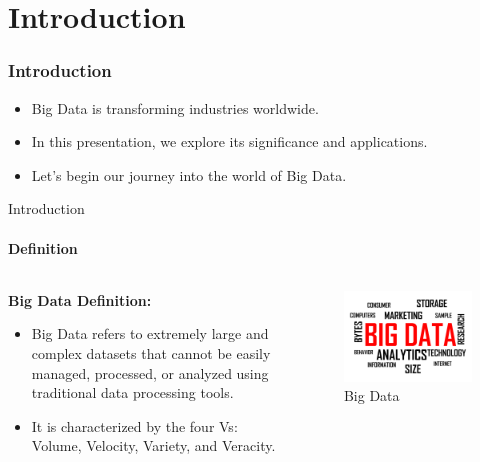 \documentclass{beamer}
\begin{document}
\section{Introduction}
	\begin{frame}
	\frametitle{Introduction}
		\begin{itemize}
  			\item Big Data is transforming industries worldwide.
  			\item In this presentation, we explore its significance and applications.
  			\item Let's begin our journey into the world of Big Data.
		\end{itemize}
	\end{frame}
	\begin{frame}[label=definition]{Introduction}
	\framesubtitle{Definition}
		\begin{columns}
    		\begin{column}{0.5\textwidth} %
      		\textbf{Big Data Definition:}
      		\begin{itemize}
        		\item Big Data refers to extremely large and complex datasets that cannot be easily managed, processed, or analyzed using traditional data processing tools.
        		\item It is characterized by the four Vs: Volume, Velocity, Variety, and Veracity.
      		\end{itemize}
    		\end{column}
    		\begin{column}{0.5\textwidth} %
      		\begin{figure}
        		\includegraphics[width=\linewidth]{resources/bigdata0.png} %
        		\caption{Big Data}
      		\end{figure}
    		\end{column}
  		\end{columns}
	\end{frame}
\end{document}
